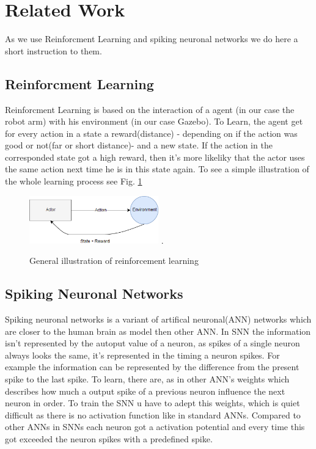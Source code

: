 \section{Related Work}
As we use Reinforcment Learning and spiking neuronal networks we do here a short instruction to them.
\subsection{Reinforcment Learning}
Reinforcment Learning is based on the interaction of a agent (in our case the robot arm) with his environment (in our case Gazebo). To Learn, the agent get for every action in a state a reward(distance) - depending on if the action was good or not(far or short distance)- and a new state. If the action in the corresponded state got a high reward, then it's more likeliky that the actor uses the same action next time he is in this state again. To see a simple illustration of the whole learning process see Fig. \ref{re_base}
\begin{figure}[H]
	\centering
	\includegraphics[width=2.2in]{img/re_base.png}
	\DeclareGraphicsExtensions.
	\caption{General illustration of reinforcement learning}
	\label{re_base}
\end{figure}

\subsection{Spiking Neuronal Networks}
Spiking neuronal networks is a variant of artifical neuronal(ANN) networks which are closer to the human brain as model then other ANN. In SNN the information isn't represented by the autoput value of a neuron, as spikes of a single neuron always looks the same, it's represented in the timing a neuron spikes. For example the information can be represented by the difference from the present spike to the last spike. To learn, there are, as in other ANN's weights which describes how much a output spike of a previous neuron influence the next neuron in order. To train the SNN u have to adept this weights, which is quiet difficult as there is no activation function like in standard ANNs. Compared to other ANNs in SNNs each neuron got a activation potential and every time this got exceeded the neuron spikes with a predefined spike.

